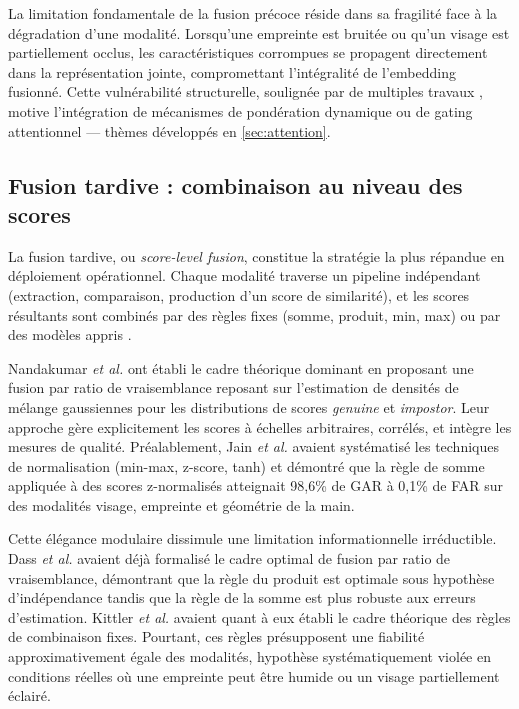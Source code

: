 \documentclass[12pt,a4paper]{report}
\begin{document}
La limitation fondamentale de la fusion pr\'{e}coce r\'{e}side dans sa fragilit\'{e} face \`{a} la d\'{e}gradation d'une modalit\'{e}. Lorsqu'une empreinte est bruit\'{e}e ou qu'un visage est partiellement occlus, les caract\'{e}ristiques corrompues se propagent directement dans la repr\'{e}sentation jointe, compromettant l'int\'{e}gralit\'{e} de l'embedding fusionn\'{e}. Cette vuln\'{e}rabilit\'{e} structurelle, soulign\'{e}e par de multiples travaux \cite{liang2024deep, soleymani2021quality}, motive l'int\'{e}gration de m\'{e}canismes de pond\'{e}ration dynamique ou de gating attentionnel --- th\`{e}mes d\'{e}velopp\'{e}s en \ref{sec:attention}.

\subsection{Fusion tardive : combinaison au niveau des scores}

La fusion tardive, ou \textit{score-level fusion}, constitue la strat\'{e}gie la plus r\'{e}pandue en d\'{e}ploiement op\'{e}rationnel. Chaque modalit\'{e} traverse un pipeline ind\'{e}pendant (extraction, comparaison, production d'un score de similarit\'{e}), et les scores r\'{e}sultants sont combin\'{e}s par des r\`{e}gles fixes (somme, produit, min, max) ou par des mod\`{e}les appris \cite{nandakumar2008likelihood}.

Nandakumar \textit{et al.} \cite{nandakumar2008likelihood} ont \'{e}tabli le cadre th\'{e}orique dominant en proposant une fusion par ratio de vraisemblance reposant sur l'estimation de densit\'{e}s de m\'{e}lange gaussiennes pour les distributions de scores \textit{genuine} et \textit{impostor}. Leur approche g\`{e}re explicitement les scores \`{a} \'{e}chelles arbitraires, corr\'{e}l\'{e}s, et int\`{e}gre les mesures de qualit\'{e}. Pr\'{e}alablement, Jain \textit{et al.} \cite{jain2005score} avaient syst\'{e}matis\'{e} les techniques de normalisation (min-max, z-score, tanh) et d\'{e}montr\'{e} que la r\`{e}gle de somme appliqu\'{e}e \`{a} des scores z-normalis\'{e}s atteignait 98,6\% de GAR \`{a} 0,1\% de FAR sur des modalit\'{e}s visage, empreinte et g\'{e}om\'{e}trie de la main.

Cette \'{e}l\'{e}gance modulaire dissimule une limitation informationnelle irr\'{e}ductible. Dass \textit{et al.} \cite{dass2005principled} avaient d\'{e}j\`{a} formalis\'{e} le cadre optimal de fusion par ratio de vraisemblance, d\'{e}montrant que la r\`{e}gle du produit est optimale sous hypoth\`{e}se d'ind\'{e}pendance tandis que la r\`{e}gle de la somme est plus robuste aux erreurs d'estimation. Kittler \textit{et al.} avaient quant \`{a} eux \'{e}tabli le cadre th\'{e}orique des r\`{e}gles de combinaison fixes. Pourtant, ces r\`{e}gles pr\'{e}supposent une fiabilit\'{e} approximativement \'{e}gale des modalit\'{e}s, hypoth\`{e}se syst\'{e}matiquement viol\'{e}e en conditions r\'{e}elles o\`{u} une empreinte peut \^{e}tre humide ou un visage partiellement \'{e}clair\'{e}.
\end{document}
